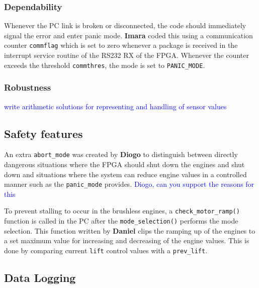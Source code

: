 \documentclass{article}
\newcommand\todo[1]{\textcolor{blue}{#1}} %
\begin{document}
\subsubsection{Dependability}
Whenever the PC link is broken or disconnected, the code should immediately signal the error and enter panic mode. \textbf{Imara} coded this using a communication counter \texttt{commflag} which is set to zero whenever a package is received in the interrupt service routine of the RS232 RX of the FPGA. Whenever the counter exceeds the threshold \texttt{commthres}, the mode is set to \texttt{PANIC\_MODE}. 

\subsubsection{Robustness}
\todo{write arithmetic solutions for representing and handling of sensor values}


\subsection{Safety features}
An extra \texttt{abort\_mode} was created by \textbf{Diogo} to distinguish between directly dangerous situations where the FPGA should shut down the engines and shut down and situations where the system can reduce engine values in a controlled manner such as the \texttt{panic\_mode} provides. \todo{Diogo, can you support the reasons for this}

To prevent stalling to occur in the brushless engines, a \texttt{check\_motor\_ramp()} function is called in the PC after the \texttt{mode\_selection()} performs the mode selection. This function written by \textbf{Daniel} clips the ramping up of the engines to a set maximum value for increasing and decreasing of the engine values. This is done by comparing current \texttt{lift} control values with a \texttt{prev\_lift}. 

\subsection{Data Logging}
\end{document}
